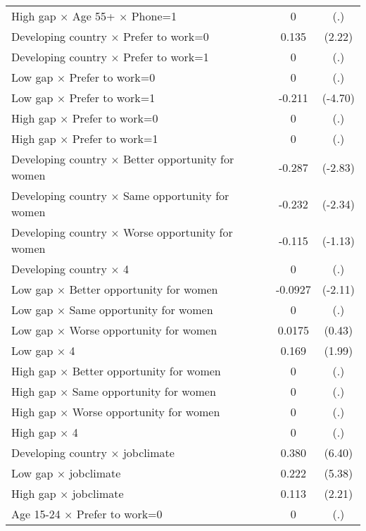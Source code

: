 {\begin{longtable}{l*{1}{cc}}
High gap $\times$ Age 55+ $\times$ Phone=1&           0         &         (.)\\
Developing country $\times$ Prefer to work=0&       0.135\sym{*}  &      (2.22)\\
Developing country $\times$ Prefer to work=1&           0         &         (.)\\
Low gap $\times$ Prefer to work=0&           0         &         (.)\\
Low gap $\times$ Prefer to work=1&      -0.211\sym{***}&     (-4.70)\\
High gap $\times$ Prefer to work=0&           0         &         (.)\\
High gap $\times$ Prefer to work=1&           0         &         (.)\\
Developing country $\times$ Better opportunity for women&      -0.287\sym{**} &     (-2.83)\\
Developing country $\times$ Same opportunity for women&      -0.232\sym{*}  &     (-2.34)\\
Developing country $\times$ Worse opportunity for women&      -0.115         &     (-1.13)\\
Developing country $\times$ 4&           0         &         (.)\\
Low gap $\times$ Better opportunity for women&     -0.0927\sym{*}  &     (-2.11)\\
Low gap $\times$ Same opportunity for women&           0         &         (.)\\
Low gap $\times$ Worse opportunity for women&      0.0175         &      (0.43)\\
Low gap $\times$ 4  &       0.169\sym{*}  &      (1.99)\\
High gap $\times$ Better opportunity for women&           0         &         (.)\\
High gap $\times$ Same opportunity for women&           0         &         (.)\\
High gap $\times$ Worse opportunity for women&           0         &         (.)\\
High gap $\times$ 4 &           0         &         (.)\\
Developing country $\times$ jobclimate&       0.380\sym{***}&      (6.40)\\
Low gap $\times$ jobclimate&       0.222\sym{***}&      (5.38)\\
High gap $\times$ jobclimate&       0.113\sym{*}  &      (2.21)\\
Age 15-24 $\times$ Prefer to work=0&           0         &         (.)\\

\end{longtable}}
